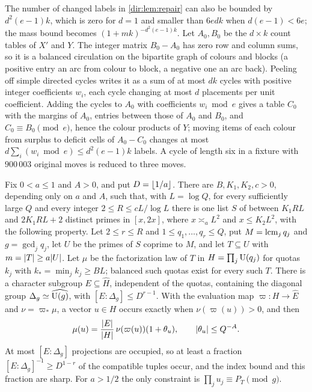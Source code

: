 \begin{remark}\label{dir:rem:cycle}
The number of changed labels in \cref{dir:lem:repair} can also be bounded by $d^2(e-1)k$, which is zero
for $d=1$ and smaller than $6edk$ when $d(e-1)<6e$; the mass bound becomes $(1+mk)^{-d^2(e-1)k}$. Let
$A_0,B_0$ be the $d\times k$ count tables of $X'$ and $Y$. The integer matrix $B_0-A_0$ has zero row and
column sums, so it is a balanced circulation on the bipartite graph of colours and blocks (a positive
entry an arc from colour to block, a negative one an arc back). Peeling off simple directed cycles writes
it as a sum of at most $dk$ cycles with positive integer coefficients $w_i$, each cycle changing at most
$d$ placements per unit coefficient. Adding the cycles to $A_0$ with coefficients $w_i\bmod e$ gives a
table $C_0$ with the margins of $A_0$, entries between those of $A_0$ and $B_0$, and $C_0\equiv B_0\pmod e$,
hence the colour products of $Y$; moving items of each colour from surplus to deficit cells of
$A_0-C_0$ changes at most $d\sum_i(w_i\bmod e)\le d^2(e-1)k$ labels. A cycle of length six in a fixture
with $900\,003$ original moves is reduced to three moves.
\end{remark}

\begin{theorem}\label{dir:thm:minority}
Fix $0<a\le1$ and $A>0$, and put $D=\lfloor1/a\rfloor$. There are $B,K_1,K_2,c>0$, depending only on $a$
and $A$, such that, with $L=\log Q$, for every sufficiently large $Q$ and every integer
$2\le R\le cL/\log L$ there is one list $S$ of between $K_1RL$ and $2K_1RL+2$ distinct primes in
$[x,2x]$, where $x\asymp_aL^2$ and $x\le K_2L^2$, with the following property. Let $2\le r\le R$ and
$1\le q_1,\dots,q_r\le Q$, put $M=\operatorname{lcm}_jq_j$ and $g=\gcd_jq_j$, let $U$ be the primes of $S$ coprime to
$M$, and let $T\subseteq U$ with $m=\lvert T\rvert\ge a\lvert U\rvert$. Let $\mu$ be the factorization law of $T$ in
$H=\prod_j\mathrm{U}(q_j)$ for quotas $k_j$ with $k_*=\min_jk_j\ge BL$; balanced such quotas exist for
every such $T$. There is a character subgroup $E\subseteq\widehat H$, independent of the quotas,
containing the diagonal group $\Delta_g\simeq\widehat{\mathrm{U}(g)}$, with $[E:\Delta_g]\le D^{r-1}$. With the
evaluation map $\varpi\colon H\to\widehat E$ and $\nu=\varpi_*\mu$, a vector $u\in H$ occurs exactly
when $\nu(\varpi(u))>0$, and then
\[
 \mu(u)=\frac{\lvert E\rvert}{\lvert H\rvert}\,\nu(\varpi(u))(1+\theta_u),\qquad\lvert\theta_u\rvert\le Q^{-A}.
\]
At most $[E:\Delta_g]$ projections are occupied, so at least a fraction $[E:\Delta_g]^{-1}\ge D^{1-r}$ of
the compatible tuples occur, and the index bound and this fraction are sharp. For $a>1/2$ the only
constraint is $\prod_ju_j\equiv P_T\pmod g$.
\end{theorem}

